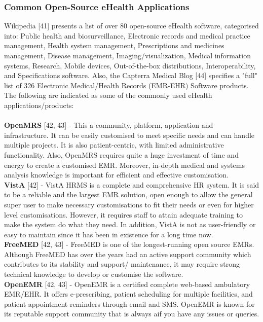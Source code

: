 \documentclass[a4paper]{article}
\begin{document}
\subsubsection{Common Open-Source eHealth Applications}
Wikipedia [41] presents a list of over 80 open-source eHealth software, categorised into: Public health and biosurveillance, Electronic records and medical practice management, Health system management, Prescriptions and medicines management, Disease management, Imaging/visualization, Medical information systems, Research, Mobile devices, Out-of-the-box distributions, Interoperability, and Specifications software. Also, the Capterra Medical Blog [44] specifies a "full" list of 326 Electronic Medical/Health Records (EMR-EHR) Software products. The following are indicated as some of the commonly used eHealth applications/products:\\ \\
{\bf OpenMRS} [42, 43] - This a community, platform, application and infrastructure. It can be easily customised to meet specific needs and can handle multiple projects. It is also patient-centric, with limited administrative functionality. Also, OpenMRS requires quite a huge investment of time and energy to create a customised EMR. Moreover, in-depth medical and systems analysis knowledge is important for efficient and effective customisation. \\
{\bf VistA} [42] - VistA HRMS is a complete and comprehensive HR system. It is said to be a reliable and the largest EMR solution, open enough to allow the general super user to make necessary customisations to fit their needs or even for higher level customisations. However, it requires staff to attain adequate training to make the system do what they need. In addition, VistA is not as user-friendly or easy to maintain since it has been in existence for a long time now.\\
{\bf FreeMED} [42, 43] - FreeMED is one of the longest-running open source EMRs. Although FreeMED has over the years had an active support community which contributes to its stability and support/ maintenance, it may require strong technical knowledge to develop or customise the software. \\
{\bf OpenEMR} [42, 43] - OpenEMR is a certified complete web-based ambulatory EMR/EHR. It offers e-prescribing, patient scheduling for multiple facilities, and patient appointment reminders through email and SMS. OpenEMR is known for its reputable support community that is always aif you have any issues or queries. \\
\end{document}
